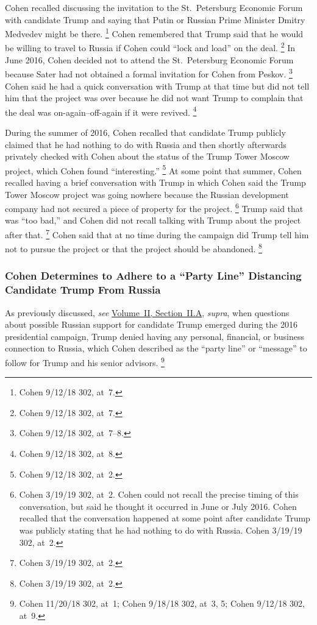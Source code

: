 Cohen recalled discussing the invitation to the St.~Petersburg Economic Forum with candidate Trump and saying that Putin or Russian Prime Minister Dmitry Medvedev might be there.%
\footnote{Cohen 9/12/18 302, at~7.}
Cohen remembered that Trump said that he would be willing to travel to Russia if Cohen could ``lock and load'' on the deal.%
\footnote{Cohen 9/12/18 302, at~7.}
In June 2016, Cohen decided not to attend the St.~Petersburg Economic Forum because Sater had not obtained a formal invitation for Cohen from Peskov.%
\footnote{Cohen 9/12/18 302, at~7--8.}
Cohen said he had a quick conversation with Trump at that time but did not tell him that the project was over because he did not want Trump to complain that the deal was on-again--off-again if it were revived.%
\footnote{Cohen 9/12/18 302, at~8.}

During the summer of 2016, Cohen recalled that candidate Trump publicly claimed that he had nothing to do with Russia and then shortly afterwards privately checked with Cohen about the status of the Trump Tower Moscow project, which Cohen found ``interesting.''%
\footnote{Cohen 9/12/18 302, at~2.}
At some point that summer, Cohen recalled having a brief conversation with Trump in which Cohen said the Trump Tower Moscow project was going nowhere because the Russian development company had not secured a piece of property for the project.%
\footnote{Cohen 3/19/19 302, at~2.
Cohen could not recall the precise timing of this conversation, but said he thought it occurred in June or July 2016.
Cohen recalled that the conversation happened at some point after candidate Trump was publicly stating that he had nothing to do with Russia.
Cohen 3/19/19 302, at~2.}
Trump said that was ``too bad,'' and Cohen did not recall talking with Trump about the project after that.%
\footnote{Cohen 3/19/19 302, at~2.}
Cohen said that at no time during the campaign did Trump tell him not to pursue the project or that the project should be abandoned.%
\footnote{Cohen 3/19/19 302, at~2.}

\subsubsection{Cohen Determines to Adhere to a ``Party Line'' Distancing Candidate Trump From Russia}

As previously discussed, \textit{see} \hyperlink{subsection.2.2.1}{Volume~II, Section~II.A}, \textit{supra}, when questions about possible Russian support for candidate Trump emerged during the 2016 presidential campaign, Trump denied having any personal, financial, or business connection to Russia, which Cohen described as the ``party line'' or ``message'' to follow for Trump and his senior advisors.%
\footnote{Cohen 11/20/18 302, at~1;
Cohen 9/18/18 302, at~3, 5;
Cohen 9/12/18 302, at~9.}

